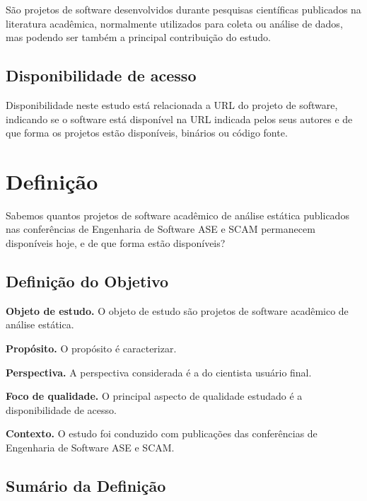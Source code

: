 São projetos de software desenvolvidos durante pesquisas científicas publicados
na literatura acadêmica, normalmente utilizados para coleta ou análise de
dados, mas podendo ser também a principal contribuição do estudo.

\subsection{Disponibilidade de acesso}

Disponibilidade neste estudo está relacionada a URL do projeto de software,
indicando se o software está disponível na URL indicada pelos seus autores e de
que forma os projetos estão disponíveis, binários ou código fonte.


\section{Definição} \label{estudo1:definicao} %

Sabemos quantos projetos de software acadêmico de análise estática publicados
nas conferências de Engenharia de Software ASE e SCAM permanecem disponíveis
hoje, e de que forma estão disponíveis?

\subsection{Definição do Objetivo}

\begin{description}
\item{\bf Objeto de estudo.} 
O objeto de estudo são projetos de software acadêmico de análise estática.

\item{\bf Propósito.} 
O propósito é caracterizar.

\item{\bf Perspectiva.} 
A perspectiva considerada é a do cientista usuário final.

\item{\bf Foco de qualidade.} 
O principal aspecto de qualidade estudado é a disponibilidade de acesso.

\item{\bf Contexto.} 
O estudo foi conduzido com publicações das conferências de Engenharia de Software ASE e SCAM.

\end{description}

\subsection{Sumário da Definição}

